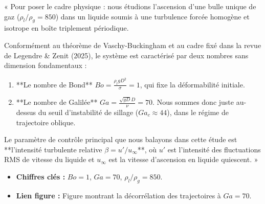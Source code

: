 \documentclass[11pt,a4paper]{article}
\begin{document}
\begin{tcolorbox}[slidebox,title=Diapositive 2 : Contexte Physique et Paramètres Adimensionnels]
\begin{tcolorbox}[keybox,title=Ce qu'il faut dire à l'oral :]
« Pour poser le cadre physique : nous étudions l'ascension d'une bulle unique de gaz ($\rho_l/\rho_g = 850$) dans un liquide soumis à une turbulence forcée homogène et isotrope en boîte triplement périodique.

Conformément au théorème de Vaschy-Buckingham et au cadre fixé dans la revue de Legendre \& Zenit (2025), le système est caractérisé par deux nombres sans dimension fondamentaux :
\begin{enumerate}
    \item **Le nombre de Bond** $Bo = \frac{\rho_l g D^2}{\sigma} = 1$, qui fixe la déformabilité initiale.
    \item **Le nombre de Galilée** $Ga = \frac{\sqrt{gD}D}{\nu} = 70$. Nous sommes donc juste au-dessus du seuil d'instabilité de sillage ($Ga_c \approx 44$), dans le régime de trajectoire oblique.
\end{enumerate}

Le paramètre de contrôle principal que nous balayons dans cette étude est **l'intensité turbulente relative $\beta = u'/u_\infty$**, où $u'$ est l'intensité des fluctuations RMS de vitesse du liquide et $u_\infty$ est la vitesse d'ascension en liquide quiescent. »
\end{tcolorbox}

\begin{itemize}
    \item \textbf{Chiffres clés :} $Bo=1$, $Ga=70$, $\rho_l/\rho_g = 850$.
    \item \textbf{Lien figure :} Figure montrant la décorrélation des trajectoires à $Ga=70$.
\end{itemize}
\end{tcolorbox}
\end{document}
